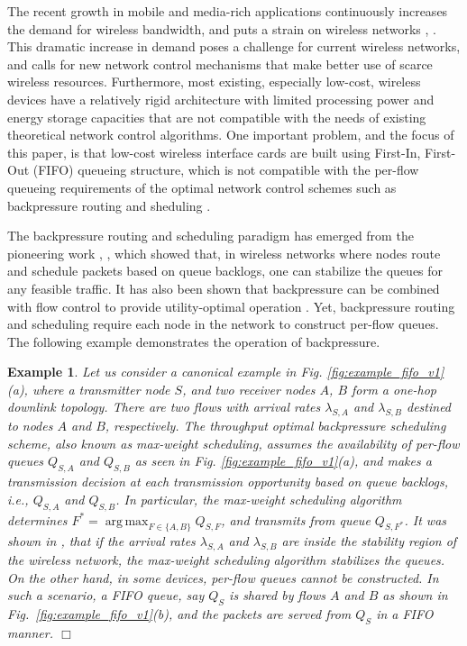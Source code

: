 \documentclass[conference]{IEEEtran}
\newcommand{\ie}{{\em i.e., }}
\newtheorem{example}{Example}
\DeclareMathOperator*{\argmax}{arg\,max}
\begin{document}
The recent growth in mobile and media-rich applications continuously increases the demand for wireless bandwidth, and puts a strain on wireless networks \cite{cisco_index}, \cite{ericsson_report}. This dramatic increase in demand poses a challenge for current wireless networks, and calls for new network control mechanisms that make better use of scarce wireless resources. Furthermore, most existing, especially low-cost, wireless devices have a relatively rigid architecture with limited processing power and energy storage capacities that are not compatible with the needs of existing theoretical network control algorithms. One important problem, and the focus of this paper, is that low-cost wireless interface cards are built using First-In, First-Out (FIFO) queueing structure, which is not compatible with the per-flow queueing requirements of the optimal network control schemes such as backpressure routing and sheduling \cite{tass_eph1}.


The backpressure routing and scheduling paradigm has emerged from the pioneering work \cite{tass_eph1}, \cite{tass_eph2}, which showed that, in wireless networks where nodes route and schedule packets based on queue backlogs, one can stabilize the queues for any feasible traffic. It has also been shown that backpressure can be combined with flow control to provide utility-optimal operation \cite{neely_mod}. Yet, backpressure routing and scheduling require each node in the network to construct per-flow queues. The following example demonstrates the operation of backpressure. 

\begin{example}
Let us consider a canonical example in Fig. \ref{fig:example_fifo_v1}(a), where a transmitter node $S$, and two receiver nodes $A$, $B$ form a one-hop downlink topology. There are two flows with arrival rates $\lambda_{S,A}$ and $\lambda_{S,B}$ destined to nodes $A$ and $B$, respectively. The throughput optimal backpressure scheduling scheme, also known as max-weight scheduling, assumes the availability of
per-flow queues $Q_{S,A}$ and $Q_{S,B}$ as seen in Fig. \ref{fig:example_fifo_v1}(a), and 
makes a transmission decision at each transmission opportunity based on queue backlogs, \ie $Q_{S,A}$ and $Q_{S,B}$. In particular, the max-weight scheduling algorithm determines $F^{*} = \argmax_{F \in \{A,B\}} Q_{S,F}$, and transmits from queue $Q_{S,F^{*}}$. It was shown in \cite{tass_eph1}, \cite{tass_eph2} that if the arrival rates $\lambda_{S,A}$ and $\lambda_{S,B}$ are inside the stability region of the wireless network, the max-weight scheduling algorithm stabilizes the queues. On the other hand, in some devices, per-flow queues cannot be constructed. In such a scenario, a FIFO queue, say $Q_{S}$ is shared by flows $A$ and $B$ as shown in Fig.~\ref{fig:example_fifo_v1}(b), and the packets are served from $Q_{S}$ in a FIFO manner.
\hfill $\Box$
\end{example}
\end{document}
